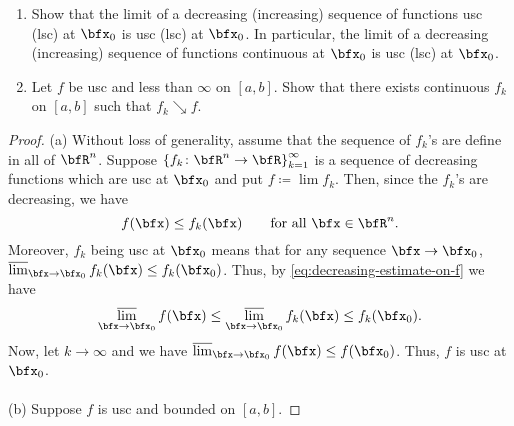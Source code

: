 \begin{problem}
\begin{enumerate}[label=(\alph*)]
\item Show that the limit of a decreasing (increasing) sequence of
  functions usc (lsc) at $\bfx_0$ is usc (lsc) at $\bfx_0$. In particular,
  the limit of a decreasing (increasing) sequence of functions continuous
  at $\bfx_0$ is usc (lsc) at $\bfx_0$.
\item Let $f$ be usc and less than $\infty$ on $[a,b]$. Show that there
  exists continuous $f_k$ on $[a,b]$ such that $f_k\searrow f$.
\end{enumerate}
\end{problem}
\begin{proof}
(a) Without loss of generality, assume that the sequence of $f_k$'s are
define in all of $\bfR^n$. Suppose
$\left\{f_k\colon\bfR^n\to\bfR\right\}_{k=1}^\infty$ is a sequence of
decreasing functions which are usc at $\bfx_0$ and put $f\coloneqq\lim
f_k$. Then, since the $f_k$'s are decreasing, we have
\begin{equation}
  \label{eq:decreasing-estimate-on-f}
f(\bfx)\leq f_k(\bfx)\qquad\text{for all $\bfx\in\bfR^n$.}
\end{equation}
Moreover, $f_k$ being usc at $\bfx_0$ means that for any sequence
$\bfx\to\bfx_0$, $\varlimsup_{\bfx\to\bfx_0} f_k(\bfx)\leq
f_k(\bfx_0)$. Thus, by \eqref{eq:decreasing-estimate-on-f} we have
\begin{equation}
  \label{eq:limit-estimate-on-f}
\varlimsup_{\bfx\to\bfx_0}f(\bfx)\leq\varlimsup_{\bfx\to\bfx_0}
f_k(\bfx)\leq f_k(\bfx_0).
\end{equation}
Now, let $k\to\infty$ and we have $\varlimsup_{\bfx\to\bfx_0} f(\bfx)\leq
f(\bfx_0)$. Thus, $f$ is usc at $\bfx_0$.
\\\\
(b) Suppose $f$ is usc and bounded on $[a,b]$.
\end{proof}
\newpage

